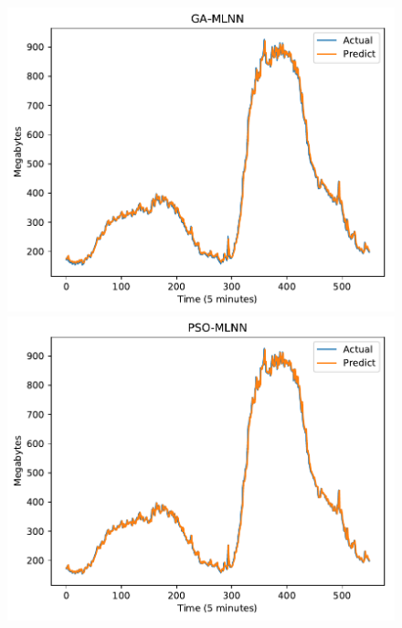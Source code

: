 \documentclass[11pt,twoside]{article}
\begin{document}
\begin{multicols}{2}
\begin{figure}[!ht] 
  \begin{minipage}[b]{0.33\linewidth}
    \centering
    \includegraphics[width=0.9\linewidth]{images/pdf/predict/k2/eu_k2_ga_mlnn.pdf} 
  \end{minipage}
  \begin{minipage}[b]{0.33\linewidth}
    \centering
    \includegraphics[width=0.9\linewidth]{images/pdf/predict/k2/eu_k2_pso_mlnn.pdf} 
  \end{minipage} 
  \begin{minipage}[b]{0.33\linewidth}
    \centering

\end{minipage}
\end{figure}
\end{multicols}
\end{document}
